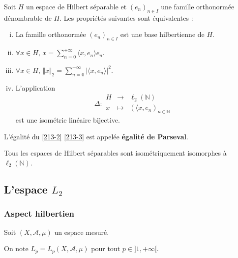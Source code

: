 	\begin{theorem}
		\label{213-2}
		Soit $H$ un espace de Hilbert séparable et $(e_n)_{n \in I}$ une famille orthonormée dénombrable de $H$. Les propriétés suivantes sont équivalentes :
		\begin{enumerate}[(i)]
			\item La famille orthonormée $(e_n)_{n \in I}$ est une base hilbertienne de $H$.
			\item $\forall x \in H, \, x = \sum_{n=0}^{+\infty} \langle x, e_n \rangle e_n$.
			\item \label{213-3} $\forall x \in H, \, \Vert x \Vert_2 = \sum_{n=0}^{+\infty} \vert \langle x, e_n \rangle \vert^2$.
			\item L'application
			\[
			\Delta :
			\begin{array}{ccc}
				H &\rightarrow& \ell_2(\mathbb{N}) \\
				x &\mapsto& (\langle x, e_n)_{n \in \mathbb{N}}
			\end{array}
			\]
			est une isométrie linéaire bijective.
		\end{enumerate}
	\end{theorem}
	
	\begin{remark}
		L'égalité du \cref{213-2} \cref{213-3} est appelée \textbf{égalité de Parseval}.
	\end{remark}
	
	
	\begin{corollary}
		Tous les espaces de Hilbert séparables sont isométriquement isomorphes à $\ell_2(\mathbb{N})$.
	\end{corollary}
	
	\subsection{L'espace \texorpdfstring{$L_2$}{L₂}}
	
	\subsubsection{Aspect hilbertien}
	
	
	Soit $(X, \mathcal{A}, \mu)$ un espace mesuré.
	
	\begin{notation}
		On note $L_p = L_p(X, \mathcal{A}, \mu)$ pour tout $p \in ]1, +\infty[$.
	\end{notation}
	
